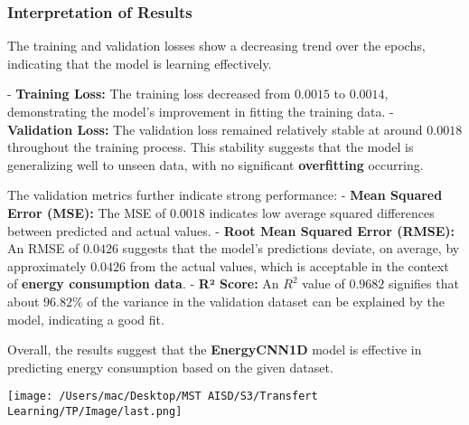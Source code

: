 \documentclass{article}
\begin{document}
\subsubsection{Interpretation of Results}
The training and validation losses show a decreasing trend over the epochs, indicating that the model is learning effectively. 

- \textbf{Training Loss:} The training loss decreased from \(0.0015\) to \(0.0014\), demonstrating the model's improvement in fitting the training data.
- \textbf{Validation Loss:} The validation loss remained relatively stable at around \(0.0018\) throughout the training process. This stability suggests that the model is generalizing well to unseen data, with no significant \textbf{overfitting} occurring.

The validation metrics further indicate strong performance:
- \textbf{Mean Squared Error (MSE):} The MSE of \(0.0018\) indicates low average squared differences between predicted and actual values.
- \textbf{Root Mean Squared Error (RMSE):} An RMSE of \(0.0426\) suggests that the model's predictions deviate, on average, by approximately \(0.0426\) from the actual values, which is acceptable in the context of \textbf{energy consumption data}.
- \textbf{R² Score:} An \(R^2\) value of \(0.9682\) signifies that about \(96.82\%\) of the variance in the validation dataset can be explained by the model, indicating a good fit.

Overall, the results suggest that the \textbf{EnergyCNN1D} model is effective in predicting energy consumption based on the given dataset.

\begin{center}
    \texttt{[image: /Users/mac/Desktop/MST AISD/S3/Transfert Learning/TP/Image/last.png]}
\end{center}
\end{document}
